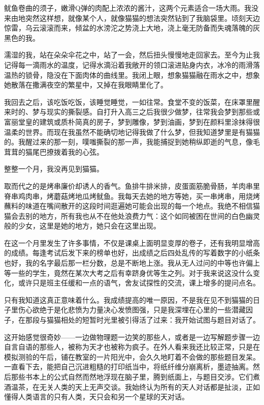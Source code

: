 \documentclass{article}
\begin{document}
鱿鱼卷曲的须子，嫩滑Q弹的肉配上浓浓的酱汁，这两个元素适合一场大雨。我没来由地突然这样想，就像某个人，就像猫猫的想法突然钻到了我脑袋里。顷刻天边惊雷，乌云滚滚而来，倾盆的水滂沱之势浇上大地，浇上毫无防备而失魂落魄的灰黑色的我。



濡湿的我，站在朵朵伞花之中，站了一会，然后扭头慢慢地走回家去。至今为止我记得每一滴雨水的温度，记得水滴沿着我敞开的领口滚进贴身内衣，冰冷的雨滑落温热的锁骨，隐没在下面肉体的曲线里。我闭上眼，想象猫猫融在雨水之中，想象她散落在撒满夜空的繁星中，又掉在我眼睛里化了。



我回去之后，该吃饭吃饭，该睡觉睡觉，一如往常。食堂不变的饭菜，在床罩里醒来时的、梦与现实的撕裂感。自打升入高三之后我很少做梦，往常我会梦到那些或富丽堂皇的建筑或质朴简真的房子，梦到雕像，梦到油画，梦到在颜料里涂抹得很温柔的世界。而现在我虽然不能确切地记得我做了什么梦，但我知道梦里是有猫猫的。我醒过来的那一刻，噗嗤撕裂的那一声，我能捕捉到她稍纵即逝的气息，像毛茸茸的猫尾巴撩拨着我的心弦。



整整一个月，我没再见到猫猫。



取而代之的是烤串廉价却诱人的香气。鱼排牛排米排，皮蛋面筋脆骨肠，羊肉串里脊串鸡肉串，烤蘑菇烤地瓜烤鱿鱼。我每天去她的地方等她，买一串烤串，用烧烤蘸料的味道在嘴间散开的这段时间逛遍她可能会出现的每一个地点。我绝不相信猫猫会去别的地方，所有我也从不在他处浪费力气：这个如同被困在世间的白色幽灵般的少女，这里是她的地方，她只会在这里出现。



在这一个月里发生了许多事情，不仅是课桌上面明显变厚的卷子，还有我明显增高的成绩。每逢考试后发下来的榜单也好，出成绩之后四处乱传的写着数字的小纸条也好，我的名字最后那一栏分数，总是不断地上涨。我从无人过问的中等也许偏上等一些的学生，竟然在某次大考之后有幸跻身优等生之列。对于我来说这没什么变化，或许只是班主任缓和一点的语气，舍友试探性的交流，课上增多的提问点名。



只有我知道这真正意味着什么。我成绩提高的唯一原因，不是我在见不到猫猫的日子里伤心欲绝于是化悲愤为力量决心发愤图强，只是我深埋在心里的一些潜藏因子，在那段与猫猫相处的短暂时光里被引得活了过来：我开始试图与题目对话了。



这开始感觉很奇妙——一边做物理题一边笑的那些人，或者是一边写解题步骤一边自言自语的那些人，被称为天才也被称为疯子。在外人看来我还比较正常，只是在模拟测验的午后，铺在教室的一片阳光中，会久久地盯着不会做的那些题目发呆。一直看下去，能把自己沉进粗糙的打印纸当中，将纸纤维分崩离析，墨迹抽离。然后那些书本上的公式自然而然地浮现在脑子里，腾到纸面上，与题目交涉。它们煮酒温茶，在无关人类的天上无声交谈。我始终认为所有的天人对话都是扯淡，正如懂得人类语言的只有人类，天只会和另一个星球的天对话。
\end{document}
